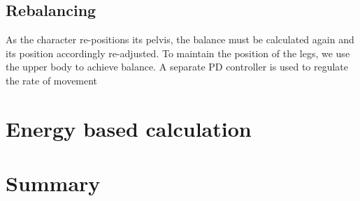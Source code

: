 \subsection{Rebalancing}
As the character re-positions its pelvis, the balance must be calculated again and its position accordingly re-adjusted.  To maintain the position of the legs, we use the upper body to achieve balance.  A separate PD controller is used to regulate the rate of movement

\section{Energy based calculation}


\section{Summary}
\label{subsection:animation_summary}